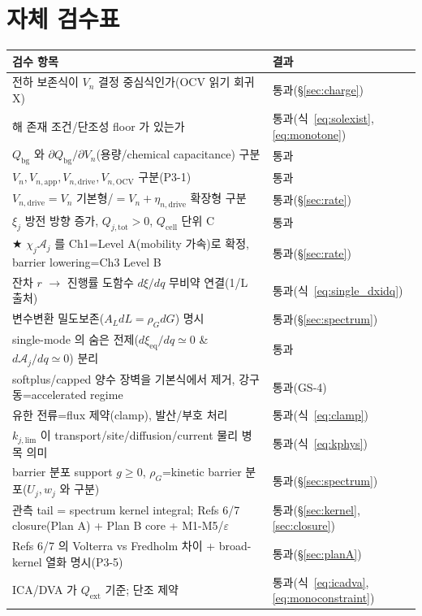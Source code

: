 \documentclass[11pt,a4paper]{article}
\newcommand{\eq}{\mathrm{eq}}
\newcommand{\app}{\mathrm{app}}
\newcommand{\drive}{\mathrm{drive}}
\newcommand{\tot}{\mathrm{tot}}
\newcommand{\bg}{\mathrm{bg}}
\newcommand{\cell}{\mathrm{cell}}
\newcommand{\ext}{\mathrm{ext}}
\newcommand{\OCV}{\mathrm{OCV}}
\begin{document}
\section{자체 검수표}\label{sec:selfcheck}
\begin{longtable}{p{} p{}}
\toprule 검수 항목 & 결과 \\ \midrule \endhead
전하 보존식이 $V_n$ 결정 중심식인가(OCV 읽기 회귀 X) & 통과(\S\ref{sec:charge}) \\
해 존재 조건/단조성 floor 가 있는가 & 통과(식~\eqref{eq:solexist},\eqref{eq:monotone}) \\
$Q_\bg$ 와 $\partial Q_\bg/\partial V_n$(용량/chemical capacitance) 구분 & 통과 \\
$V_n,V_{n,\app},V_{n,\drive},V_{n,\OCV}$ 구분(P3-1) & 통과 \\
$V_{n,\drive}=V_n$ 기본형/$=V_n+\eta_{n,\drive}$ 확장형 구분 & 통과(\S\ref{sec:rate}) \\
$\xi_j$ 방전 방향 증가, $Q_{j,\tot}>0$, $Q_\cell$ 단위 C & 통과 \\
★ $\chi_j\mathcal A_j$ 를 Ch1=Level A(mobility 가속)로 확정, barrier lowering=Ch3 Level B & 통과(\S\ref{sec:rate}) \\
잔차 $r$ $\to$ 진행률 도함수 $d\xi/dq$ 무비약 연결(1/L 출처) & 통과(식~\eqref{eq:single_dxidq}) \\
변수변환 밀도보존($A_L dL=\rho_G dG$) 명시 & 통과(\S\ref{sec:spectrum}) \\
single-mode 의 숨은 전제($d\xi_\eq/dq\simeq0$ \& $d\mathcal A_j/dq\simeq0$) 분리 & 통과 \\
softplus/capped 양수 장벽을 기본식에서 제거, 강구동=accelerated regime & 통과(GS-4) \\
유한 전류=flux 제약(clamp), 발산/부호 처리 & 통과(식~\eqref{eq:clamp}) \\
$k_{j,\mathrm{lim}}$ 이 transport/site/diffusion/current 물리 병목 의미 & 통과(식~\eqref{eq:kphys}) \\
barrier 분포 support $g\ge0$, $\rho_G$=kinetic barrier 분포($U_j,w_j$ 와 구분) & 통과(\S\ref{sec:spectrum}) \\
관측 tail = spectrum kernel integral; Refs 6/7 closure(Plan A) + Plan B core + M1-M5/$\varepsilon$ & 통과(\S\ref{sec:kernel},\ref{sec:closure}) \\
Refs 6/7 의 Volterra vs Fredholm 차이 + broad-kernel 열화 명시(P3-5) & 통과(\S\ref{sec:planA}) \\
ICA/DVA 가 $Q_\ext$ 기준; 단조 제약 & 통과(식~\eqref{eq:icadva},\eqref{eq:monoconstraint}) \\

\end{longtable}
\end{document}

